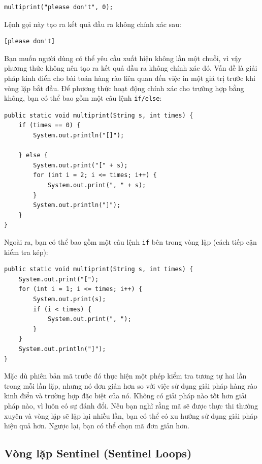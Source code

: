 \begin{verbatim}
multiprint("please don't", 0);
\end{verbatim}


Lệnh gọi này tạo ra kết quả đầu ra không chính xác sau:
 
\begin{verbatim}
[please don't] 
\end{verbatim}


Bạn muốn người dùng có thể yêu cầu xuất hiện không lần một chuỗi, vì vậy phương thức không nên tạo ra kết quả đầu ra không chính xác đó. Vấn đề là giải pháp kinh điển cho bài toán hàng rào liên quan đến việc in một giá trị trước khi vòng lặp bắt đầu. Để phương thức hoạt động chính xác cho trường hợp bằng không, bạn có thể bao gồm một câu lệnh \texttt{if/else}:

\begin{verbatim}
public static void multiprint(String s, int times) {
    if (times == 0) {
        System.out.println("[]");

    } else {
        System.out.print("[" + s);
        for (int i = 2; i <= times; i++) {
            System.out.print(", " + s);
        }
        System.out.println("]");
    }
}
\end{verbatim}


Ngoài ra, bạn có thể bao gồm một câu lệnh \texttt{if} bên trong vòng lặp (cách tiếp cận kiểm tra kép):

\begin{verbatim}
public static void multiprint(String s, int times) {
    System.out.print("[");
    for (int i = 1; i <= times; i++) {
        System.out.print(s);
        if (i < times) {
            System.out.print(", ");
        }
    }
    System.out.println("]");
}
\end{verbatim}


Mặc dù phiên bản mã trước đó thực hiện một phép kiểm tra tương tự hai lần trong mỗi lần lặp, nhưng nó đơn giản hơn so với việc sử dụng giải pháp hàng rào kinh điển và trường hợp đặc biệt của nó. Không có giải pháp nào tốt hơn giải pháp nào, vì luôn có sự đánh đổi. Nếu bạn nghĩ rằng mã sẽ được thực thi thường xuyên và vòng lặp sẽ lặp lại nhiều lần, bạn có thể có xu hướng sử dụng giải pháp hiệu quả hơn. Ngược lại, bạn có thể chọn mã đơn giản hơn.

\subsection*{Vòng lặp Sentinel (Sentinel Loops)}

